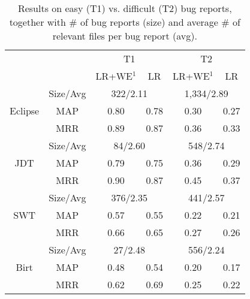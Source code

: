
\begin{table}
\centering
\caption{Results on easy (T1) vs. difficult (T2) bug reports, together with \# of bug reports (size) and average \# of relevant files per bug report (avg).}
\begin{adjustbox}{width=0.47\textwidth}
\begin{tabular}{|c|c|cc|cc|} \cline{3-6}
\multicolumn{2}{c|}{} & \multicolumn{2}{c|}{T1} & \multicolumn{2}{c|}{T2} \\ \cline{3-6}
\multicolumn{2}{c|}{} & LR+WE$^1$ & LR & LR+WE$^1$ & LR \Tstrut\Bstrut\\ \hline
 & Size/Avg & \multicolumn{2}{c|}{322/2.11} & \multicolumn{2}{c|}{1,334/2.89} \\ \cline{2-6}
Eclipse & MAP & 0.80 & 0.78 & 0.30 & 0.27 \\
 & MRR & 0.89 & 0.87 & 0.36 & 0.33 \\ \hline
 & Size/Avg & \multicolumn{2}{c|}{84/2.60} & \multicolumn{2}{c|}{548/2.74} \\ \cline{2-6}
JDT & MAP & 0.79 & 0.75 & 0.36 & 0.29 \\
& MRR & 0.90 & 0.87 & 0.45 & 0.37 \\ \hline
 & Size/Avg & \multicolumn{2}{c|}{376/2.35} & \multicolumn{2}{c|}{441/2.57} \\ \cline{2-6} 
SWT & MAP & 0.57 & 0.55 & 0.22 & 0.21 \\
& MRR & 0.66 & 0.65 & 0.27 & 0.26 \\ \hline
 & Size/Avg & \multicolumn{2}{c|}{27/2.48} & \multicolumn{2}{c|}{556/2.24} \\ \cline{2-6}
Birt & MAP & 0.48 & 0.54 & 0.20 & 0.17 \\
& MRR & 0.62 & 0.69 & 0.25 & 0.22 \\ \hline
\end{tabular}
\end{adjustbox}
\label{tab:comparison on T1 and T2}
\end{table}

